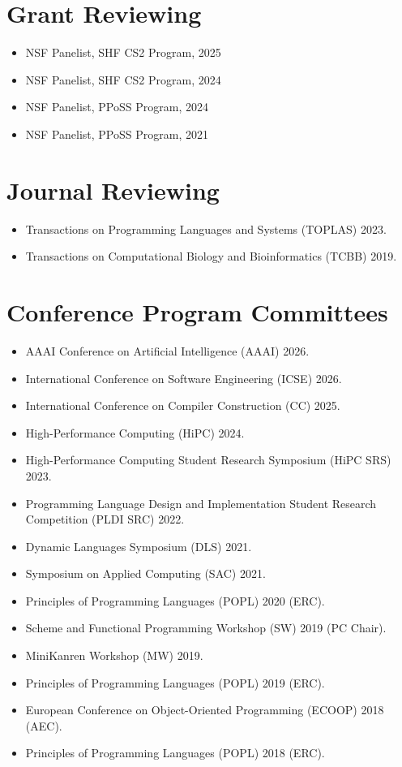 \documentclass[line]{res}
\begin{document}
\begin{resume}
\section{\large Grant Reviewing} \vspace{0.45cm}
\begin{itemize}
  \item NSF Panelist, SHF CS2 Program, 2025
  \item NSF Panelist, SHF CS2 Program, 2024
  \item NSF Panelist, PPoSS Program, 2024
  \item NSF Panelist, PPoSS Program, 2021
\end{itemize}

\section{\large Journal Reviewing} \vspace{0.45cm}
\begin{itemize}
  \item Transactions on Programming Languages and Systems (TOPLAS) 2023.
  \item Transactions on Computational Biology and Bioinformatics (TCBB) 2019. 
\end{itemize}

\section{\large Conference Program Committees} \vspace{0.45cm}
\begin{itemize}
  \item AAAI Conference on Artificial Intelligence (AAAI) 2026.
  \item International Conference on Software Engineering (ICSE) 2026.
  \item International Conference on Compiler Construction (CC) 2025.
  \item High-Performance Computing (HiPC) 2024.
  \item High-Performance Computing Student Research Symposium (HiPC SRS) 2023.
  \item Programming Language Design and Implementation Student Research Competition (PLDI SRC) 2022.
  \item Dynamic Languages Symposium (DLS) 2021.
  \item Symposium on Applied Computing (SAC) 2021.
  \item Principles of Programming Languages (POPL) 2020 (ERC).
  \item Scheme and Functional Programming Workshop (SW) 2019 (PC Chair).
  \item MiniKanren Workshop (MW) 2019.
  \item Principles of Programming Languages (POPL) 2019 (ERC).
  \item European Conference on Object-Oriented Programming (ECOOP) 2018 (AEC).
  \item Principles of Programming Languages (POPL) 2018 (ERC).
\end{itemize}


\end{resume}
\end{document}
